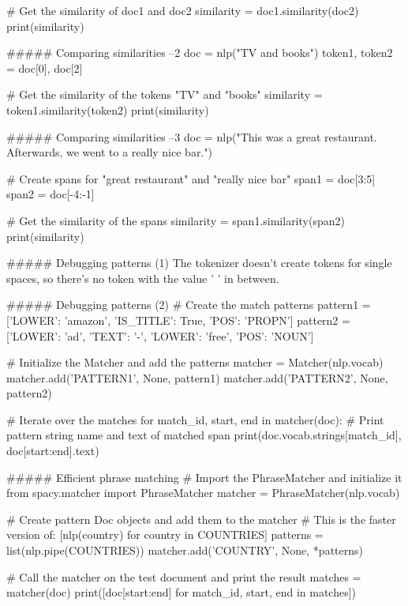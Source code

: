 # Get the similarity of doc1 and doc2
similarity = doc1.similarity(doc2)
print(similarity)



##### Comparing similarities  --2
doc = nlp("TV and books")
token1, token2 = doc[0], doc[2]

# Get the similarity of the tokens "TV" and "books" 
similarity = token1.similarity(token2)
print(similarity)



##### Comparing similarities  --3
doc = nlp("This was a great restaurant. Afterwards, we went to a really nice bar.")

# Create spans for "great restaurant" and "really nice bar"
span1 = doc[3:5]
span2 = doc[-4:-1]

# Get the similarity of the spans
similarity = span1.similarity(span2)
print(similarity)

##### Debugging patterns (1)
The tokenizer doesn't create tokens for single spaces, so there's no token with the value ' ' in between.


##### Debugging patterns (2)
# Create the match patterns
pattern1 = [{'LOWER': 'amazon'}, {'IS_TITLE': True, 'POS': 'PROPN'}]
pattern2 = [{'LOWER': 'ad'}, {'TEXT': '-'}, {'LOWER': 'free'}, {'POS': 'NOUN'}]

# Initialize the Matcher and add the patterns
matcher = Matcher(nlp.vocab)
matcher.add('PATTERN1', None, pattern1)
matcher.add('PATTERN2', None, pattern2)

# Iterate over the matches
for match_id, start, end in matcher(doc):
    # Print pattern string name and text of matched span
    print(doc.vocab.strings[match_id], doc[start:end].text)
    
    
    
##### Efficient phrase matching
# Import the PhraseMatcher and initialize it
from spacy.matcher import PhraseMatcher
matcher = PhraseMatcher(nlp.vocab)

# Create pattern Doc objects and add them to the matcher
# This is the faster version of: [nlp(country) for country in COUNTRIES]
patterns = list(nlp.pipe(COUNTRIES))
matcher.add('COUNTRY', None, *patterns)

# Call the matcher on the test document and print the result
matches = matcher(doc)
print([doc[start:end] for match_id, start, end in matches])
